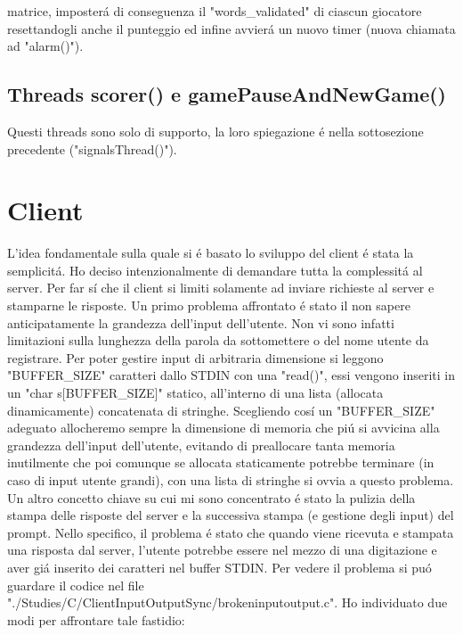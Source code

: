 matrice, imposter\'a di conseguenza il "words\_validated" di ciascun giocatore resettandogli anche il punteggio ed infine avvier\'a un nuovo timer (nuova chiamata ad "alarm()").
 
 \subsection{Threads scorer() e gamePauseAndNewGame()}
 
 Questi threads sono solo di supporto, la loro spiegazione \'e nella sottosezione precedente ("signalsThread()").

\section{Client}
L'idea fondamentale sulla quale si \'e basato lo sviluppo del client \'e stata la semplicit\'a. Ho deciso intenzionalmente di demandare tutta la complessit\'a al server. Per far s\'i che il client si limiti solamente ad inviare richieste al server e stamparne le risposte. Un primo problema affrontato \'e stato il non sapere anticipatamente la grandezza dell'input dell'utente. Non vi sono infatti limitazioni sulla lunghezza della parola da sottomettere o del nome utente da registrare. Per poter gestire input di arbitraria dimensione si leggono "BUFFER\_SIZE" caratteri dallo STDIN con una "read()", essi vengono inseriti in un "char s[BUFFER\_SIZE]" statico, all'interno di una lista (allocata dinamicamente) concatenata di stringhe. Scegliendo cos\'i un "BUFFER\_SIZE" adeguato allocheremo sempre la dimensione di memoria che pi\'u si avvicina alla grandezza dell'input dell'utente, evitando di preallocare tanta memoria inutilmente che poi comunque se allocata staticamente potrebbe terminare (in caso di input utente grandi), con una lista di stringhe si ovvia a questo problema.
\\
Un altro concetto chiave su cui mi sono concentrato \'e stato la pulizia della stampa delle risposte del server e la successiva stampa (e gestione degli input) del prompt. Nello specifico, il problema \'e stato che quando viene ricevuta e stampata una risposta dal server, l'utente potrebbe essere nel mezzo di una digitazione e aver gi\'a inserito dei caratteri nel buffer STDIN. Per vedere il problema si pu\'o guardare il codice nel file "./Studies/C/ClientInputOutputSync/brokeninputoutput.c". Ho individuato due modi per affrontare tale fastidio:

